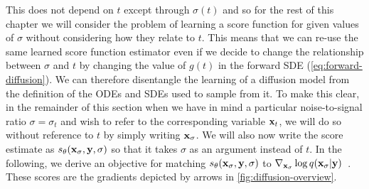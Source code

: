 This does not depend on $t$ except through $\sigma(t)$ and so for the rest of this chapter we will consider the problem of learning a score function for given values of $\sigma$ without considering how they relate to $t$. This means that we can re-use the same learned score function estimator even if we decide to change the relationship between $\sigma$ and $t$ by changing the value of $g(t)$ in the forward SDE (\cref{eq:forward-diffusion}). We can therefore disentangle the learning of a diffusion model from the definition of the ODEs and SDEs used to sample from it. To make this clear, in the remainder of this section when we have in mind a particular noise-to-signal ratio $\sigma=\sigma_t$ and wish to refer to the corresponding variable ${\mathbf{x}}_t$, we will do so without reference to $t$ by simply writing ${\mathbf{x}}_\sigma$. We will also now write the score estimate as $s_\theta({\mathbf{x}}_\sigma, {\mathbf{y}}, \sigma)$ so that it takes $\sigma$ as an argument instead of $t$. In the following, we derive an objective for matching $s_\theta({\mathbf{x}}_\sigma, {\mathbf{y}}, \sigma)$ to $\nabla_{{\mathbf{x}}_\sigma} \log q({\mathbf{x}}_\sigma |{\mathbf{y}})$~\citep{vincent2011connection,song2019generative}. These scores are the gradients depicted by arrows in \cref{fig:diffusion-overview}.

